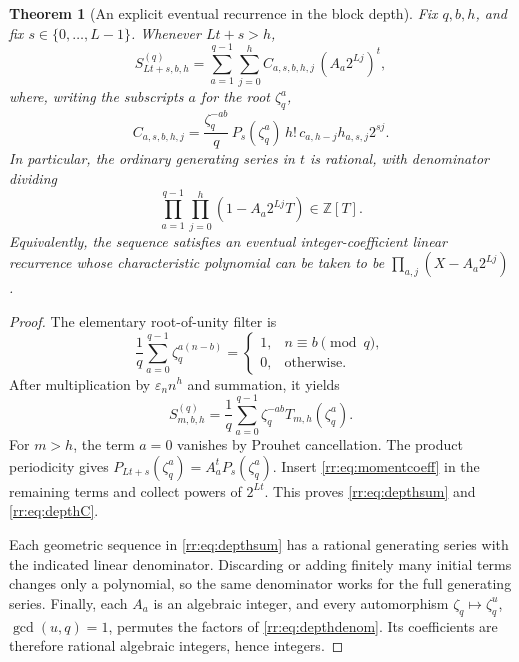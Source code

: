 \documentclass[11pt,a4paper,oneside,openany]{book}
\numberwithin{equation}{chapter}
\newtheorem{theorem}{Theorem}[chapter]
\theoremstyle{definition}
\theoremstyle{remark}
\newcommand{\eps}{\varepsilon}
\newcommand{\Z}{\mathbb Z}
\begin{document}
\begin{theorem}[An explicit eventual recurrence in the block depth]
\label{rr:thm:depth}
Fix \(q,b,h\), and fix \(s\in\{0,\ldots,L-1\}\). Whenever \(Lt+s>h\),
\begin{equation}
 S^{(q)}_{Lt+s,b,h}
 =\sum_{a=1}^{q-1}\sum_{j=0}^h
 C_{a,s,b,h,j}\,(A_a2^{Lj})^t,
 \label{rr:eq:depthsum}
\end{equation}
where, writing the subscripts \(a\) for the root \(\zeta_q^a\),
\begin{equation}
 C_{a,s,b,h,j}=
 \frac{\zeta_q^{-ab}}q\,P_s(\zeta_q^a)\,h!\,
 c_{a,h-j}h_{a,s,j}2^{sj}.
 \label{rr:eq:depthC}
\end{equation}
In particular, the ordinary generating series in \(t\) is rational, with denominator dividing
\begin{equation}
 \prod_{a=1}^{q-1}\prod_{j=0}^{h}(1-A_a2^{Lj}T)\in\Z[T].
 \label{rr:eq:depthdenom}
\end{equation}
Equivalently, the sequence satisfies an eventual integer-coefficient linear recurrence whose characteristic polynomial can be taken to be
\(\prod_{a,j}(X-A_a2^{Lj})\).
\end{theorem}
\begin{proof}
The elementary root-of-unity filter is
\[
 \frac1q\sum_{a=0}^{q-1}\zeta_q^{a(n-b)}
 =\begin{cases}1,&n\equiv b\pmod q,\\0,&\text{otherwise}.
 \end{cases}
\]
After multiplication by \(\eps_nn^h\) and summation, it yields
\[
 S^{(q)}_{m,b,h}=\frac1q\sum_{a=0}^{q-1}\zeta_q^{-ab}T_{m,h}(\zeta_q^a).
\]
For \(m>h\), the term \(a=0\) vanishes by Prouhet cancellation. The product periodicity gives
\(P_{Lt+s}(\zeta_q^a)=A_a^tP_s(\zeta_q^a)\).
Insert \eqref{rr:eq:momentcoeff} in the remaining terms and collect powers of \(2^{Lt}\). This proves \eqref{rr:eq:depthsum} and \eqref{rr:eq:depthC}.

Each geometric sequence in \eqref{rr:eq:depthsum} has a rational generating series with the indicated linear denominator. Discarding or adding finitely many initial terms changes only a polynomial, so the same denominator works for the full generating series. Finally, each \(A_a\) is an algebraic integer, and every automorphism \(\zeta_q\mapsto\zeta_q^u\), \(\gcd(u,q)=1\), permutes the factors of \eqref{rr:eq:depthdenom}. Its coefficients are therefore rational algebraic integers, hence integers.
\end{proof}
\end{document}
